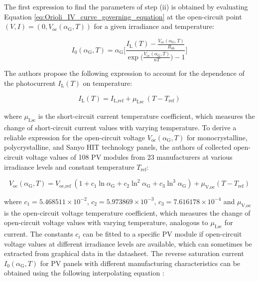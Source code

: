 The first expression to find the parameters of step (ii) is
obtained by evaluating Equation \ref{eq:Orioli_IV_curve_governing_equation}
at the open-circuit point \((V, I) = (0, V_{\text{oc}}(\alpha_{\text{G}}, T))\)
for a given irradiance and temperature:

\begin{equation}
    I_{0}(\alpha_{\text{G}}, T) = \alpha_{\text{G}} \Biggl[ \frac{I_{\text{L}}(T) - \frac{V_{\text{oc}}(\alpha_{\text{G}}, T)}{R_{\text{sh}}}}{\exp \bigl( \frac{V_{\text{oc}}(\alpha_{\text{G}}, T)}{nT}\bigr) - 1 } \Biggr]
    \label{eq:Orioli_photocurrent_Io}
\end{equation}

\noindent
The authors propose the following expression to account for
the dependence of the photocurrent \(I_{\text{L}}(T)\) on temperature:

\begin{equation}
    I_{\text{L}}(T) = I_{\text{L,ref}} + \mu_{\text{I,sc}} \: (T - T_{\text{ref}})
    \label{eq:Orioli_reverse_saturation_current_IL}
\end{equation}

\noindent
where \(\mu_{\text{I,sc}}\) is the short-circuit current temperature coefficient,
which measures the change of short-circuit current values with varying temperature.
To derive a reliable expression for the open-circuit voltage \(V_{\text{oc}}(\alpha_{\text{G}}, T)\)
for monocrystalline, polycrystalline, and Sanyo HIT technology panels, the authors
of \cite{Orioli} collected open-circuit voltage values of 108 PV modules from 23
manufacturers at various irradiance levels and constant temperature \(T_{\text{ref}}\):

\begin{equation}
    V_{\text{oc}}(\alpha_{\text{G}}, T) = V_{\text{oc,ref}}  \: (1 + c_{1}\ln\alpha_{\text{G}} + c_{2}\ln^2\alpha_{\text{G}} + c_{3}\ln^3\alpha_{\text{G}}) + \mu_{\text{V,oc}} (T - T_{\text{ref}})
\end{equation}

\noindent
where \(c_{1} = 5.468511 \times 10^{-2}\), \(c_{2} = 5.973869 \times 10^{-3}\),  
\(c_{3} = 7.616178 \times 10^{-4}\) and \(\mu_{\text{V,oc}}\) is the open-circuit voltage
temperature coefficient, which measures the change of open-circuit voltage
values with varying temperature, analogous to \(\mu_{\text{I,sc}}\) for current.
The constants \(c_{i}\) can be fitted to a specific PV module if open-circuit
voltage values at different irradiance levels are available, which can
sometimes be extracted from graphical data in the datasheet.
The reverse saturation current \(I_{0}(\alpha_{\text{G}}, T)\) for PV panels with
different manufacturing characteristics can be obtained using the
following interpolating equation \cite[p. 1365]{LoBrano}:

